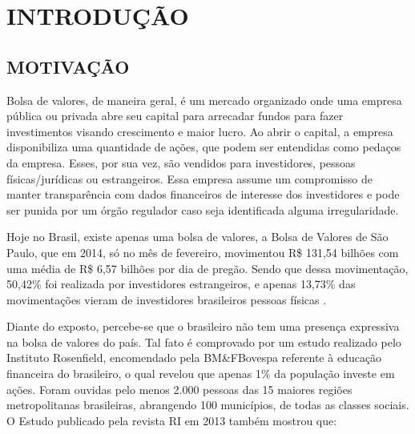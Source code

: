 \chapter[Introdução]{INTRODUÇÃO}

\section{MOTIVAÇÃO}


Bolsa de valores, de maneira geral, é um mercado organizado onde uma empresa pública ou privada abre seu capital para arrecadar fundos para fazer investimentos visando crescimento e maior lucro. Ao abrir o capital, a empresa disponibiliza uma quantidade de ações, que podem ser entendidas como pedaços da empresa. Esses, por sua vez, são vendidos para investidores, pessoas físicas/jurídicas ou estrangeiros. Essa empresa assume um compromisso de manter transparência com dados financeiros de interesse dos investidores e pode ser punida por um órgão regulador caso seja identificada alguma irregularidade.

Hoje no Brasil, existe apenas uma bolsa de valores, a Bolsa de Valores de São Paulo, que em 2014, só no mês de fevereiro, movimentou R\$ 131,54 bilhões com uma média de R\$ 6,57 bilhões por dia de pregão. Sendo que dessa movimentação, 50,42\% foi realizada por investidores estrangeiros, e apenas 13,73\% das movimentações vieram de investidores brasileiros pessoas físicas \cite{bovespa2014}.

Diante do exposto, percebe-se que o brasileiro não tem uma presença expressiva na bolsa de valores do país. Tal fato é comprovado por um estudo realizado pelo Instituto Rosenfield, encomendado pela BM\&FBovespa referente à educação financeira do brasileiro, o qual revelou que apenas 1\% da população investe em ações. Foram ouvidas pelo menos 2.000 pessoas das 15 maiores regiões metropolitanas brasileiras, abrangendo 100 municípios, de todas as classes sociais\cite{isabella2013}. O Estudo  publicado pela revista RI em 2013 também mostrou que:

